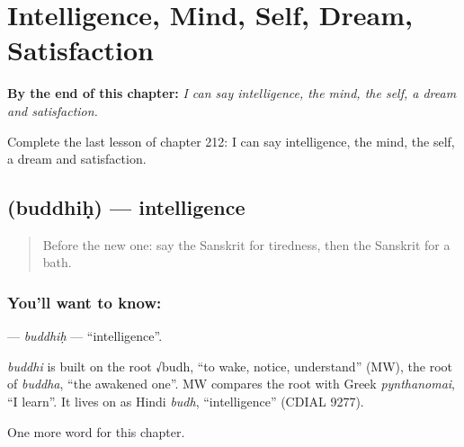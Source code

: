 
\chapter{Intelligence, Mind, Self, Dream, Satisfaction}
\label{ch:sa-intelligence-mind-self-dream-satisfaction}

\begin{chapteropening}
\textbf{By the end of this chapter:} \emph{I can say intelligence, the mind, the self, a dream and satisfaction.}

Complete the last lesson of chapter 212: I can say intelligence, the mind, the self, a dream and satisfaction.
\end{chapteropening}

\section[\texorpdfstring{\sk{बुद्धिः} (buddhiḥ)}{बुद्धिः (buddhiḥ)}]{ (buddhiḥ) — intelligence}

\label{lesson:SA-C212-buddhih}



\begin{quote}
Before the new one: say the Sanskrit for tiredness, then the Sanskrit for a bath.
\end{quote}

\subsection*{You'll want to know: }
\textbf{} — \emph{buddhiḥ} — \textquotedblleft{}intelligence\textquotedblright{}.

\begin{cousinweb}
\emph{buddhi} is built on the root √budh, \textquotedblleft{}to wake, notice, understand\textquotedblright{} (MW), the root of \emph{buddha}, \textquotedblleft{}the awakened one\textquotedblright{}. MW compares the root with Greek \emph{pynthanomai}, \textquotedblleft{}I learn\textquotedblright{}. It lives on as Hindi \emph{budh}, \textquotedblleft{}intelligence\textquotedblright{} (CDIAL 9277).
\end{cousinweb}

\begin{grammarlens}[title={What you've built}]
One more word for this chapter.
\end{grammarlens}


